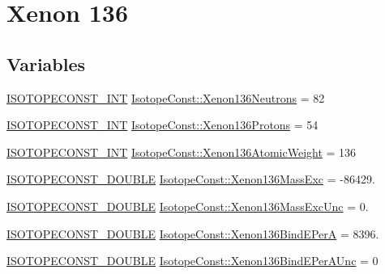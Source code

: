\hypertarget{group___isotope_const-_xenon-_xe136}{}\section{Xenon 136}
\label{group___isotope_const-_xenon-_xe136}
\subsection*{Variables}
\begin{DoxyCompactItemize}
\item 
\mbox{\hyperlink{group___isotope_const-_macros_ga5f18360b3e99483a35c32d789e62621c}{I\+S\+O\+T\+O\+P\+E\+C\+O\+N\+S\+T\+\_\+\+I\+NT}} \mbox{\hyperlink{group___isotope_const-_xenon-_xe136_ga02e0064eaf34be42b8e51cfbd667db52}{Isotope\+Const\+::\+Xenon136\+Neutrons}} = 82
\item 
\mbox{\hyperlink{group___isotope_const-_macros_ga5f18360b3e99483a35c32d789e62621c}{I\+S\+O\+T\+O\+P\+E\+C\+O\+N\+S\+T\+\_\+\+I\+NT}} \mbox{\hyperlink{group___isotope_const-_xenon-_xe136_ga5499858eeae539d15d0d068252493918}{Isotope\+Const\+::\+Xenon136\+Protons}} = 54
\item 
\mbox{\hyperlink{group___isotope_const-_macros_ga5f18360b3e99483a35c32d789e62621c}{I\+S\+O\+T\+O\+P\+E\+C\+O\+N\+S\+T\+\_\+\+I\+NT}} \mbox{\hyperlink{group___isotope_const-_xenon-_xe136_ga279bf3d2ad4d5629e479d5845ee2bdfb}{Isotope\+Const\+::\+Xenon136\+Atomic\+Weight}} = 136
\item 
\mbox{\hyperlink{group___isotope_const-_macros_ga8f45a7272ce02c0b4c65c44636ed719a}{I\+S\+O\+T\+O\+P\+E\+C\+O\+N\+S\+T\+\_\+\+D\+O\+U\+B\+LE}} \mbox{\hyperlink{group___isotope_const-_xenon-_xe136_ga747b7fa5754796ef12a2bdd9e197c1eb}{Isotope\+Const\+::\+Xenon136\+Mass\+Exc}} = -\/86429.
\item 
\mbox{\hyperlink{group___isotope_const-_macros_ga8f45a7272ce02c0b4c65c44636ed719a}{I\+S\+O\+T\+O\+P\+E\+C\+O\+N\+S\+T\+\_\+\+D\+O\+U\+B\+LE}} \mbox{\hyperlink{group___isotope_const-_xenon-_xe136_ga6cf57f5fe270e436f9cfb55131926d40}{Isotope\+Const\+::\+Xenon136\+Mass\+Exc\+Unc}} = 0.
\item 
\mbox{\hyperlink{group___isotope_const-_macros_ga8f45a7272ce02c0b4c65c44636ed719a}{I\+S\+O\+T\+O\+P\+E\+C\+O\+N\+S\+T\+\_\+\+D\+O\+U\+B\+LE}} \mbox{\hyperlink{group___isotope_const-_xenon-_xe136_ga69f59375607d66f7b8ea49295ef8a7f3}{Isotope\+Const\+::\+Xenon136\+Bind\+E\+PerA}} = 8396.
\item 
\mbox{\hyperlink{group___isotope_const-_macros_ga8f45a7272ce02c0b4c65c44636ed719a}{I\+S\+O\+T\+O\+P\+E\+C\+O\+N\+S\+T\+\_\+\+D\+O\+U\+B\+LE}} \mbox{\hyperlink{group___isotope_const-_xenon-_xe136_ga1d1b86c5796d098a6f7885a4f460ac1f}{Isotope\+Const\+::\+Xenon136\+Bind\+E\+Per\+A\+Unc}} = 0

\end{DoxyCompactItemize}
